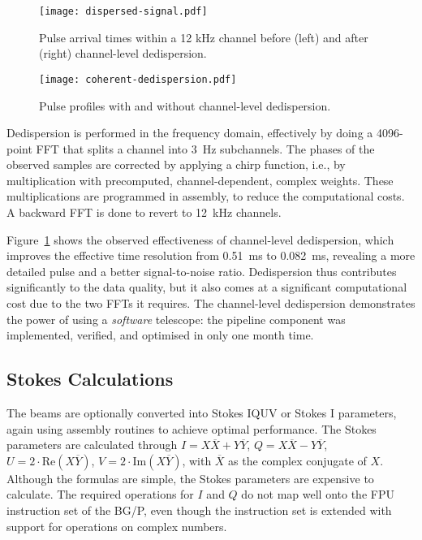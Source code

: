 \documentclass{llncs}
\begin{document}
\begin{figure}[ht]
\begin{minipage}[t]{0.60\textwidth}
\center
\texttt{[image: dispersed-signal.pdf]}
\caption{Pulse arrival times within a 12 kHz channel before (left) and after (right) channel-level dedispersion.}
\label{fig:dispersed-signal}
\end{minipage}
\hfill
\begin{minipage}[t]{0.35\textwidth}
\center
\texttt{[image: coherent-dedispersion.pdf]}
\caption{Pulse profiles with and without channel-level dedispersion.}
\label{fig:dedispersion-result}
\end{minipage}
\end{figure}

Dedispersion is performed in the frequency domain, effectively by doing a 4096-point FFT that splits a channel into 3~Hz subchannels. The phases of the observed samples are corrected by applying a chirp function, i.e., by multiplication with precomputed, channel-dependent, complex weights. These multiplications are programmed in assembly, to reduce the computational costs. A backward FFT is done to revert to 12~kHz channels.

Figure~\ref{fig:dedispersion-result} shows the observed effectiveness of channel-level dedispersion, which improves the effective time resolution from 0.51~ms to 0.082~ms, revealing a more detailed pulse and a better signal-to-noise ratio. Dedispersion thus contributes significantly to the data quality, but it also comes at a significant computational cost due to the two FFTs it requires. The channel-level dedispersion demonstrates the power of using a \emph{software\/} telescope: the pipeline component was implemented, verified, and optimised in only one month time.

\subsection{Stokes Calculations}

The beams are optionally converted into Stokes IQUV or Stokes I parameters, again using assembly routines to achieve optimal performance. The Stokes parameters are calculated through $I = X\overline{X} + Y\overline{Y}$, $Q = X\overline{X} - Y\overline{Y}$, $U = 2\cdot\mathrm{Re}(X\overline{Y})$, $V = 2\cdot\mathrm{Im}(X\overline{Y})$, with $\overline{X}$ as the complex conjugate of $X$. Although the formulas are simple, the Stokes parameters are expensive to calculate. The required operations for $I$ and $Q$ do not map well onto the FPU instruction set of the BG/P, even though the instruction set is extended with support for operations on complex numbers.
\end{document}
